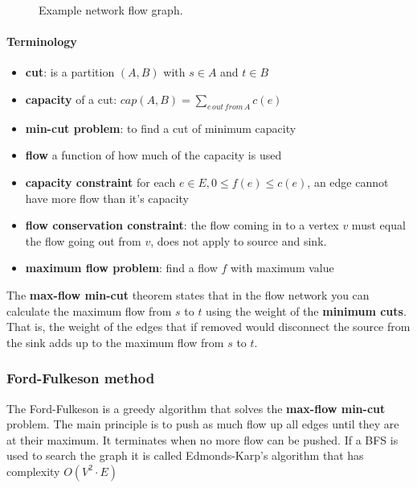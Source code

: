 \documentclass[12pt]{article} %
\begin{document}
\begin{figure}[H]
\caption{Example network flow graph.}
\label{flow}
\end{figure} 

\paragraph{Terminology}
\begin{itemize}
    \item \textbf{cut}: is a partition $(A, B)$ with $s \in A$ and $t \in B$
    \item \textbf{capacity} of a cut: $cap(A, B) = \sum_{e \, out \, from\, A} c(e)$
    \item \textbf{min-cut problem}: to find a cut of minimum capacity
    \item \textbf{flow} a function of how much of the capacity is used
    \item \textbf{capacity constraint} for each $e \in E, 0 \leq f(e) \leq c(e)$, an edge cannot have more flow than it's capacity
    \item \textbf{flow conservation constraint}: the flow coming in to a vertex $v$ must equal the flow going out from $v$, does not apply to source and sink.
    \item \textbf{maximum flow problem}: find a flow $f$ with maximum value
\end{itemize}

\par The \textbf{max-flow min-cut} theorem states that in the flow network you can calculate the maximum flow from $s$ to $t$ using the weight of the \textbf{minimum cuts}. That is, the weight of the edges that if removed would disconnect the source from the sink adds up to the maximum flow from $s$ to $t$.

\subsubsection{Ford-Fulkeson method}
The Ford-Fulkeson is a greedy algorithm that solves the \textbf{max-flow min-cut} problem. The main principle is to push as much flow up all edges until they are at their maximum. It terminates when no more flow can be pushed. If a BFS is used to search the graph it is called Edmonds-Karp's algorithm that has complexity $O(V^2 \cdot E)$
\end{document}
